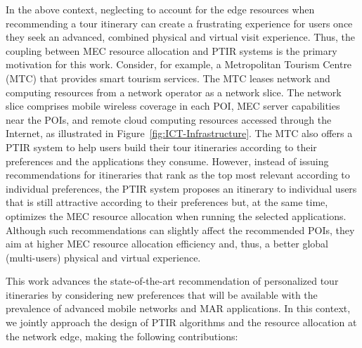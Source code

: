 In the above context, neglecting to account for the edge resources when recommending a tour itinerary can create a frustrating experience for users once they seek an advanced, combined physical and virtual visit experience. Thus, the coupling between MEC resource allocation and PTIR systems is the {primary} motivation for this work. Consider, for example, a Metropolitan Tourism Centre (MTC) that provides smart tourism services. The MTC leases network and computing resources from a network operator as a network slice. The network slice comprises mobile wireless coverage in each POI, MEC server capabilities near the POIs, and remote cloud computing resources accessed through the Internet, as illustrated in Figure~\ref{fig:ICT-Infrastructure}. The MTC also offers a PTIR system to help users build their tour itineraries according to their preferences and the applications they consume. However, instead of issuing recommendations for itineraries that rank as the top most relevant according to individual preferences, {the PTIR system proposes an itinerary to individual users that is still attractive according to their preferences but, at the same time, optimizes the MEC resource allocation when running the selected applications.} Although such recommendations can slightly affect the recommended POIs, they aim at higher MEC resource allocation efficiency and, thus, a better global (multi-users) physical and virtual experience.

This work advances the state-of-the-art {recommendation of} personalized tour itineraries by considering new preferences {that will be} available with the prevalence of advanced mobile networks and MAR applications. In this context, we jointly approach the design of PTIR algorithms and the resource allocation at the network edge, making the following contributions:


